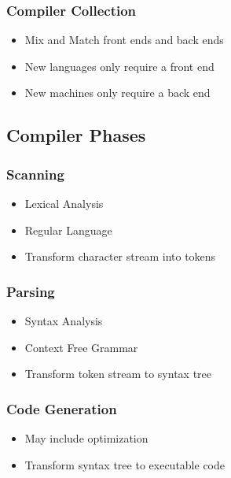 \documentclass[usepdftitle=false,professionalfonts,compress ]{beamer}
\begin{document}
{
\begin{frame}\frametitle{Compiler Collection}

	\begin{itemize}
	\item Mix and Match front ends and back ends
			\item New languages only require a front end
			\item New machines only require a back end
				\end{itemize}

\end{frame}}





\subsection{Compiler Phases}

{
\begin{frame}\frametitle{Scanning}

	\begin{itemize}
	\item Lexical Analysis
			\item Regular Language
			\item Transform character stream into tokens
				\end{itemize}

\end{frame}}





{
\begin{frame}\frametitle{Parsing}

	\begin{itemize}
	\item Syntax Analysis
			\item Context Free Grammar
			\item Transform token stream to syntax tree
				\end{itemize}

\end{frame}}





{
\begin{frame}\frametitle{Code Generation}

	\begin{itemize}
	\item May include optimization
			\item Transform syntax tree to executable code
				\end{itemize}

\end{frame}}
\end{document}
